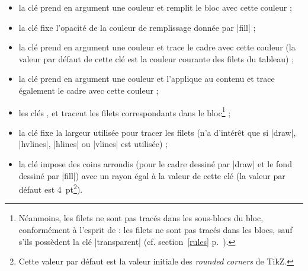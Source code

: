 \documentclass[dvipsnames]{article}%
\begin{document}
\begin{itemize}
\item {}
la clé  prend en argument une couleur et remplit le bloc
avec cette couleur ;
\item {}
la clé  fixe l'opacité de la couleur de remplissage donnée
par |fill| ;
\item {}
la clé  prend en argument une couleur et trace le cadre
avec cette couleur (la valeur par défaut de cette clé est la couleur courante
des filets du tableau) ;
\item {} 
la clé  prend en argument une couleur et l'applique au
contenu et trace également le cadre avec cette couleur ;
\item {}  
les clés ,  et 
tracent les filets correspondants dans le bloc\footnote{Néanmoins, les filets ne
  sont pas tracés dans les sous-blocs du bloc, conformément à l'esprit de
  : les filets ne sont pas tracés dans les blocs, sauf s'ils
  possèdent la clé |transparent| (cf.
  section~\ref{rules} p.~\pageref{rules}).} ;
\item {}
la clé  fixe la largeur utilisée pour tracer les
filets (n'a d'intérêt que si |draw|, |hvlines|,
|hlines| ou |vlines| est utilisée) ;
\item {} 
la clé  impose des coins arrondis (pour le
cadre dessiné par |draw| et le fond dessiné par |fill|)
avec un rayon égal à la valeur de cette clé (la valeur par défaut est
4~pt\footnote{Cette valeur par défaut est la valeur initiale des \emph{rounded
    corners} de TikZ.}). 
\end{itemize}
\end{document}
